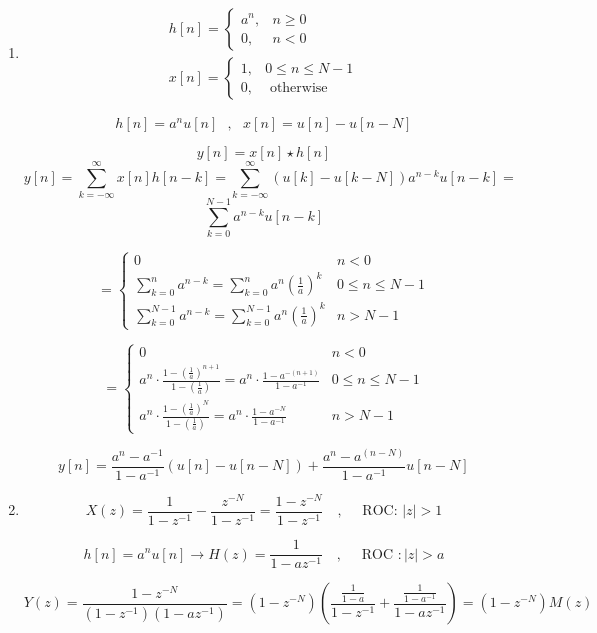\documentclass[12pt]{article}
\begin{document}
\begin{enumerate}[label = \Alph*)]
	\item
$$
\begin{array}{c}
	h[n]=\left\{\begin{array}{ll}
		a^{n}, & n \geq 0 \\
		0, & n<0
	\end{array}\right. \\
	x[n]=\left\{\begin{array}{lr}
		1, & 0 \leq n \leq N-1 \\
		0, & \text { otherwise }
	\end{array}\right.
\end{array}
$$

$$h[n] = a^n u[n] ~~~,~~~ x[n] = u[n] - u[n-N]$$

$$y[n] = x[n] \star h[n]$$
$$y[n] = \sum_{k=-\infty}^{\infty} x[n] h[n-k] = \sum_{k=-\infty}^{\infty} (u[k] - u[k-N])a^{n-k} u[n-k]=$$
$$\sum_{k=0}^{N-1} a^{n-k} u[n-k]$$

$$
=\left\{\begin{array}{ll}
	0 & n<0 \\
	\sum_{k=0}^{n} a^{n-k}=\sum_{k=0}^{n} a^{n}\left(\frac{1}{a}\right)^{k} & 0 \leq n \leq N-1 \\
	\sum_{k=0}^{N-1} a^{n-k}=\sum_{k=0}^{N-1} a^{n}\left(\frac{1}{a}\right)^{k} & n>N-1
\end{array}\right.
$$

$$
=\left\{\begin{array}{ll}
	0 & n<0 \\
	a^{n} \cdot \frac{1-\left(\frac{1}{a}\right)^{n+1}}{1-\left(\frac{1}{a}\right)}=a^{n} \cdot \frac{1-a^{-(n+1)}}{1-a^{-1}} & 0 \leq n \leq N-1 \\
	a^{n} \cdot \frac{1-\left(\frac{1}{a}\right)^{N}}{1-\left(\frac{1}{a}\right)}=a^{n} \cdot \frac{1-a^{-N}}{1-a^{-1}} & n>N-1
\end{array}\right.
$$

$$
y[n]=\frac{a^{n}-a^{-1}}{1-a^{-1}}(u[n]-u[n-N])+\frac{a^{n}-a^{(n-N)}}{1-a^{-1}} u[n-N]
$$

\item

$$
X(z)=\frac{1}{1-z^{-1}}-\frac{z^{-N}}{1-z^{-1}}=\frac{1-z^{-N}}{1-z^{-1}} \quad, \quad \text { ROC: }|z|>1
$$


$$
h[n]=a^{n} u[n] \rightarrow
H(z)=\frac{1}{1-a z^{-1}} \quad, \quad \text { ROC }:|z|>a
$$


$$Y(z) = \frac{1 - z^{-N}}{(1-z^{-1}) (1-az^{-1})} = (1 - z^{-N})(\frac{\frac{1}{1-a}}{1- z^{-1}} + \frac{\frac{1}{1 - a^{-1}}}{1 - a z^{-1}}) = (1 - z^{-N}) M(z)$$


\end{enumerate}
\end{document}
